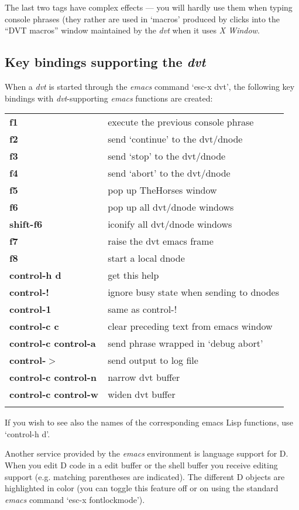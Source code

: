 The last two tags have complex effects --- you will hardly use them when typing console phrases (they rather are used in `macros' produced by clicks into the ``DVT macros'' window maintained by the \emph{dvt} when it uses \emph{X Window}.

\subsection{Key bindings supporting the \emph{dvt}}

When a \emph{dvt} is started through the \emph{emacs} command `esc-x dvt', the following key bindings with \emph{dvt}-supporting \emph{emacs} functions are created:\\ 

\begin{tabular}{>{\sffamily\bfseries}l>{\sffamily}l}
    f1 & execute the previous console phrase\\
    f2 & send `continue' to the dvt/dnode\\
    f3 & send `stop' to the dvt/dnode\\
    f4 & send `abort' to the dvt/dnode\\
    f5 & pop up TheHorses window\\
    f6 & pop up all dvt/dnode windows\\
    shift-f6 & iconify all dvt/dnode windows\\
    f7 & raise the dvt emacs frame\\
    f8 & start a local dnode\\
    control-h d & get this help\\
    control-! & ignore busy state when sending to dnodes\\
    control-1 & same as control-!\\
    control-c c & clear preceding text from emacs window\\
    control-c control-a & send phrase wrapped in `debug abort'\\
    control-$>$ & send output to log file\\
    control-c control-n & narrow dvt buffer\\
    control-c control-w & widen dvt buffer\\\\
\end{tabular}

If you wish to see also the names of the corresponding emacs Lisp functions, use `control-h d'.

Another service provided by the \emph{emacs} environment is language support for D. When you edit D code in a edit buffer or the shell buffer you receive editing support (e.g. matching parentheses are indicated). The different D objects are highlighted in color (you can toggle this feature off or on using the standard \emph{emacs} command `esc-x fontlockmode').

